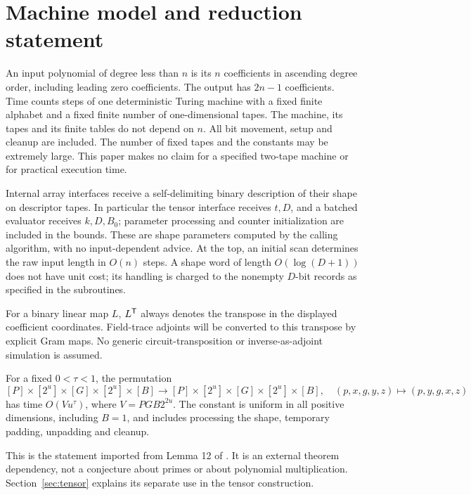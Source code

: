 \section{Machine model and reduction statement}\label{sec:model}

An input polynomial of degree less than $n$ is its $n$ coefficients in
ascending degree order, including leading zero coefficients. The output
has $2n-1$ coefficients. Time counts steps of one deterministic Turing
machine with a fixed finite alphabet and a fixed finite number of
one-dimensional tapes. The machine, its tapes and its finite tables do
not depend on $n$. All bit movement, setup and cleanup are included.
The number of fixed tapes and the constants may be extremely large.
This paper makes no claim for a specified two-tape machine or for
practical execution time.

Internal array interfaces receive a self-delimiting binary description
of their shape on descriptor tapes. In particular the tensor interface
receives $t,D$, and a batched evaluator receives $k,D,B_0$; parameter
processing and counter initialization are included in the bounds.
These are shape parameters computed by the calling algorithm, with no
input-dependent advice. At the top, an initial scan determines the raw
input length in $O(n)$ steps. A shape word of length $O(\log(D+1))$
does not have unit cost; its handling is charged to the nonempty
$D$-bit records as specified in the subroutines.

For a binary linear map $L$, $L^{\mathsf T}$ always denotes the transpose in
the displayed coefficient coordinates. Field-trace adjoints will be
converted to this transpose by explicit Gram maps. No generic
circuit-transposition or inverse-as-adjoint simulation is assumed.

\begin{contract}\label{con:swap}
For a fixed $0<\tau<1$, the permutation
\[
 [P]\times[2^u]\times[G]\times[2^u]\times[B]
 \longrightarrow [P]\times[2^u]\times[G]\times[2^u]\times[B],
 \quad(p,x,g,y,z)\longmapsto(p,y,g,x,z)
\]
has time $O(Vu^\tau)$, where $V=PGB2^{2u}$. The constant is uniform
in all positive dimensions, including $B=1$, and includes processing
the shape, temporary padding, unpadding and cleanup.
\end{contract}
This is the statement imported from Lemma 12 of \cite{OpenAI26}.
It is an external theorem dependency, not a conjecture about primes or
about polynomial multiplication. Section~\ref{sec:tensor} explains its
separate use in the tensor construction.

